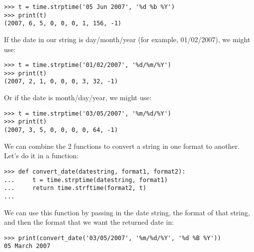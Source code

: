 \begin{listing}
\begin{verbatim}
>>> t = time.strptime('05 Jun 2007', '%d %b %Y')
>>> print(t)
(2007, 6, 5, 0, 0, 0, 1, 156, -1)
\end{verbatim}
\end{listing}

\noindent
If the date in our string is day/month/year (for example, 01/02/2007), we might use:

\begin{listing}
\begin{verbatim}
>>> t = time.strptime('01/02/2007', '%d/%m/%Y')
>>> print(t)
(2007, 2, 1, 0, 0, 0, 3, 32, -1)
\end{verbatim}
\end{listing}

\noindent
Or if the date is month/day/year, we might use:

\begin{listing}
\begin{verbatim}
>>> t = time.strptime('03/05/2007', '%m/%d/%Y')
>>> print(t)
(2007, 3, 5, 0, 0, 0, 0, 64, -1)
\end{verbatim}
\end{listing}

\noindent
We can combine the 2 functions to convert a string in one format to another. Let's do it in a function:

\begin{listing}
\begin{verbatim}
>>> def convert_date(datestring, format1, format2):
...     t = time.strptime(datestring, format1)
...     return time.strftime(format2, t)
...
\end{verbatim}
\end{listing}

\noindent
We can use this function by passing in the date string, the format of that string, and then the format that we want the returned date in:

\begin{listing}
\begin{verbatim}
>>> print(convert_date('03/05/2007', '%m/%d/%Y', '%d %B %Y'))
05 March 2007
\end{verbatim}
\end{listing}

\newpage